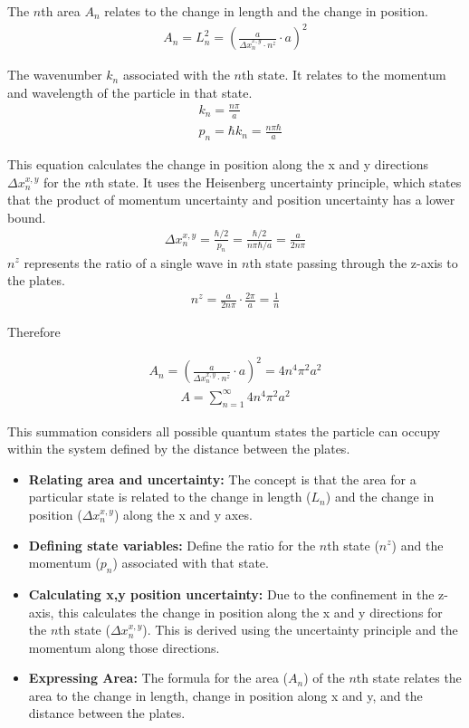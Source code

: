     The $n$th area $A_n$ relates to the change in length and the change in position.
    \begin{align}
        A_n = L_n^2 = (\frac{a}{\Delta x_n^{x,y} \cdot n^z} \cdot a)^2
    \end{align}

    The wavenumber $k_n$ associated with the $n$th state. It relates to the momentum and wavelength of the particle in that state.
    \begin{align}
        &k_n = \frac{n \pi}{a} \\
        &p_n = \hbar k_n = \frac{n \pi \hbar}{a}
    \end{align}

    This equation calculates the change in position along the x and y directions $\Delta x_n^{x,y}$ for the $n$th state. 
It uses the Heisenberg uncertainty principle, which states that the product of momentum uncertainty and position uncertainty 
has a lower bound.
    \begin{align}
        \Delta x_n^{x, y} = \frac{\hbar/2}{p_n} = \frac{\hbar/2}{n \pi \hbar/a} = \frac{a}{2 n \pi}
    \end{align}
$n^z$ represents the ratio of a single wave in $n$th state passing through the z-axis to the plates.
    \begin{align}
        n^z = \frac{a}{2 n \pi} \cdot \frac{2 \pi}{a} =\frac{1}{n}
    \end{align}
    
Therefore

    \begin{align}
        A_n = (\frac{a}{\Delta x_n^{x,y} \cdot n^z} \cdot a)^2 = 4 n^4 \pi^2 a^2
    \end{align}
    \begin{align}
        A = \sum_{n=1}^{\infty}4 n^4 \pi^2 a^2
    \end{align}

This summation considers all possible quantum states the particle can occupy within the system 
defined by the distance between the plates.
\begin{itemize}
    \item \textbf{Relating area and uncertainty:} The concept is that the area for a particular state is related to 
    the change in length ($L_n$) and the change in position ($\Delta x_n^{x,y}$) along the x and y axes.
    \item \textbf{Defining state variables:} Define the ratio for the $n$th state ($n^z$) 
    and the momentum ($p_n$) associated with that state.
    \item \textbf{Calculating x,y position uncertainty:} Due to the confinement in the z-axis, 
    this calculates the change in position along the x and y directions for the $n$th state ($\Delta x_n^{x,y}$). 
    This is derived using the uncertainty principle and the momentum along those directions.
    \item \textbf{Expressing Area:} The formula for the area ($A_n$) of the $n$th state relates the area to the change in length, 
    change in position along x and y, and the distance between the plates.
    \end{itemize}
